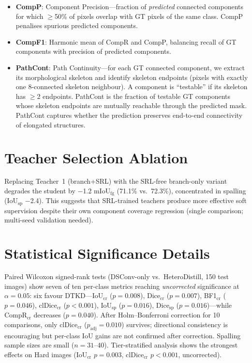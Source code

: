 \documentclass[review,authoryear]{elsarticle}
\begin{document}
\begin{itemize}[nosep]
    \item \textbf{CompP}: Component Precision---fraction of \emph{predicted} connected components for which $\geq$50\% of pixels overlap with GT pixels of the same class. CompP penalises spurious predicted components.
    \item \textbf{CompF1}: Harmonic mean of CompR and CompP, balancing recall of GT components with precision of predicted components.
    \item \textbf{PathCont}: Path Continuity---for each GT connected component, we extract its morphological skeleton and identify skeleton endpoints (pixels with exactly one 8-connected skeleton neighbour). A component is ``testable'' if its skeleton has $\geq$2 endpoints. PathCont is the fraction of testable GT components whose skeleton endpoints are mutually reachable through the predicted mask. PathCont captures whether the prediction preserves end-to-end connectivity of elongated structures.
\end{itemize}

\section{Teacher Selection Ablation}
\label{sec:supp_teacher_selection}

Replacing Teacher~1 (branch+SRL) with the SRL-free branch-only variant degrades the student by $-$1.2 mIoU$_{\text{fg}}$ (71.1\% vs.\ 72.3\%), concentrated in spalling (IoU$_{\text{sp}}$ $-$2.4). This suggests that SRL-trained teachers produce more effective soft supervision despite their own component coverage regression (single comparison; multi-seed validation needed).

\section{Statistical Significance Details}
\label{sec:supp_stats}

Paired Wilcoxon signed-rank tests (DSConv-only vs.\ HeteroDistill, 150 test images) show seven of ten per-class metrics reaching \emph{uncorrected} significance at $\alpha{=}0.05$: six favour DTKD---IoU$_{\text{cr}}$ ($p{=}0.008$), Dice$_{\text{cr}}$ ($p{=}0.007$), BF1$_{\text{cr}}$ ($p{=}0.046$), clDice$_{\text{cr}}$ ($p{<}0.001$), IoU$_{\text{sp}}$ ($p{=}0.016$), Dice$_{\text{sp}}$ ($p{=}0.016$)---while CompR$_{\text{cr}}$ decreases ($p{=}0.040$). After Holm--Bonferroni correction for 10 comparisons, only clDice$_{\text{cr}}$ ($p_{\text{adj}}{=}0.010$) survives; directional consistency is encouraging but per-class IoU gains are not confirmed after correction. Spalling sample sizes are small ($n{=}31$--40). Tier-stratified analysis shows the strongest effects on Hard images (IoU$_{\text{cr}}$ $p{=}0.003$, clDice$_{\text{cr}}$ $p{<}0.001$, uncorrected).
\end{document}
